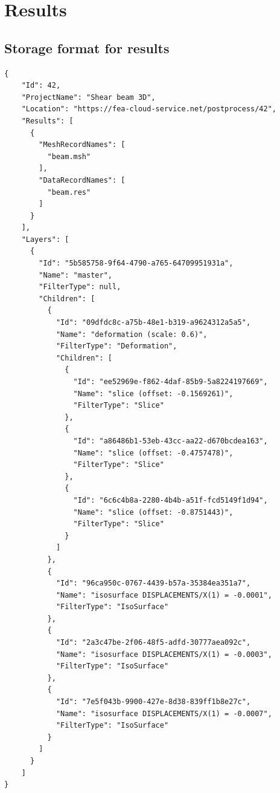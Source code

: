 \chapter{Results}

\section{Storage format for results}


\begin{lstlisting}[style=json,caption=Example of solution.json document.,label=lst:solution.json]
{
    "Id": 42,
    "ProjectName": "Shear beam 3D",
    "Location": "https://fea-cloud-service.net/postprocess/42",
    "Results": [
      {
        "MeshRecordNames": [
          "beam.msh"
        ],
        "DataRecordNames": [
          "beam.res"
        ]
      }
    ],
    "Layers": [
      {
        "Id": "5b585758-9f64-4790-a765-64709951931a",
        "Name": "master",
        "FilterType": null,
        "Children": [
          {
            "Id": "09dfdc8c-a75b-48e1-b319-a9624312a5a5",
            "Name": "deformation (scale: 0.6)",
            "FilterType": "Deformation",
            "Children": [
              {
                "Id": "ee52969e-f862-4daf-85b9-5a8224197669",
                "Name": "slice (offset: -0.1569261)",
                "FilterType": "Slice"
              },
              {
                "Id": "a86486b1-53eb-43cc-aa22-d670bcdea163",
                "Name": "slice (offset: -0.4757478)",
                "FilterType": "Slice"
              },
              {
                "Id": "6c6c4b8a-2280-4b4b-a51f-fcd5149f1d94",
                "Name": "slice (offset: -0.8751443)",
                "FilterType": "Slice"
              }
            ]
          },
          {
            "Id": "96ca950c-0767-4439-b57a-35384ea351a7",
            "Name": "isosurface DISPLACEMENTS/X(1) = -0.0001",
            "FilterType": "IsoSurface"
          },
          {
            "Id": "2a3c47be-2f06-48f5-adfd-30777aea092c",
            "Name": "isosurface DISPLACEMENTS/X(1) = -0.0003",
            "FilterType": "IsoSurface"
          },
          {
            "Id": "7e5f043b-9900-427e-8d38-839ff1b8e27c",
            "Name": "isosurface DISPLACEMENTS/X(1) = -0.0007",
            "FilterType": "IsoSurface"
          }
        ]
      }
    ]
}
\end{lstlisting}

